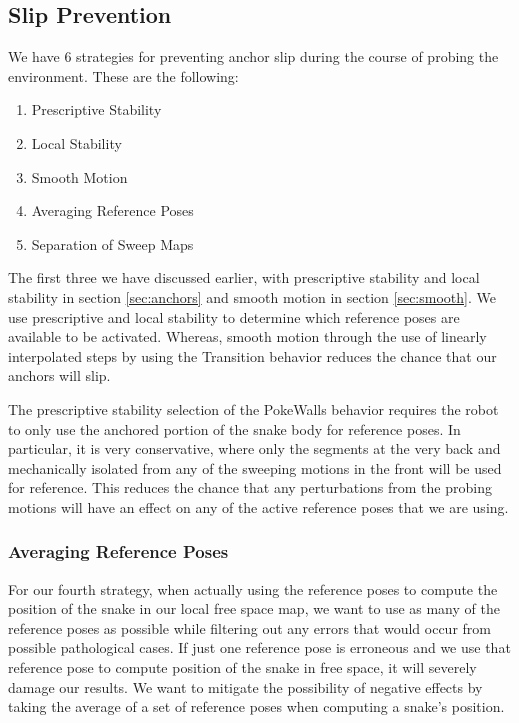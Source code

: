 \subsection{Slip Prevention}
\label{slipprevention}

We have 6 strategies for preventing anchor slip during the course of probing the environment. These are the following:


\begin{enumerate} \itemsep 1pt \parskip 0pt \parsep 0pt
  \item Prescriptive Stability
  \item Local Stability
  \item Smooth Motion
  \item Averaging Reference Poses
  \item Separation of Sweep Maps
\end{enumerate}


The first three we have discussed earlier, with prescriptive stability and local stability in section \autoref{sec:anchors} and smooth motion in section \autoref{sec:smooth}. We use prescriptive and local stability to determine which reference poses are available to be activated. Whereas, smooth motion through the use of linearly interpolated steps by using the Transition behavior reduces the chance that our anchors will slip. 

The prescriptive stability selection of the PokeWalls behavior requires the robot to only use the anchored portion of the snake body for reference poses. In particular, it is very conservative, where only the segments at the very back and mechanically isolated from any of the sweeping motions in the front will be used for reference. This reduces the chance that any perturbations from the probing motions will have an effect on any of the active reference poses that we are using.

\subsubsection{Averaging Reference Poses}
\label{averagingreferenceposes}

For our fourth strategy, when actually using the reference poses to compute the position of the snake in our local free space map, we want to use as many of the reference poses as possible while filtering out any errors that would occur from possible pathological cases. If just one reference pose is erroneous and we use that reference pose to compute position of the snake in free space, it will severely damage our results. We want to mitigate the possibility of negative effects by taking the average of a set of reference poses when computing a snake's position.

